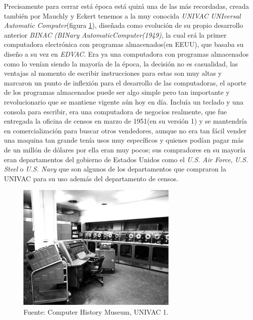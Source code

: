\documentclass[letterpaper,12pt,oneside]{book}
\begin{document}
		
		
		Precisamente para cerrar está época está quizá una de las más recordadas, creada también por Mauchly y Eckert tenemos a la muy conocida	
		\textit{UNIVAC UNIversal Automatic Computer}(figura \ref{fig:univac1}), diseñada como evolución de su propio desarrollo  anterior
		\textit{BINAC (BINary AutomaticComputer(1949)}, la cual erá la primer computadora electrónica con programas almacenados(en EEUU), que basaba su diseño
		a su vez en \textit{EDVAC}.
		Era ya una computadora con programas almacenados como lo venían siendo la mayoría de la época, la decisión no es casualidad, las
		ventajas al momento de escribir instrucciones para estas son muy altas y marcaron un punto de inflexión para el desarrollo de las computadoras,
		el aporte de los programas almacenados puede ser algo simple pero tan importante y revolucionario que se mantiene vigente aún hoy en día. Incluía un teclado y una 
		consola para escribir, era una computadora de negocios realmente, que
		fue entregada la oficina de censos en marzo de 1951(en su versión 1) y se mantendría en comercialización para buscar otros vendedores, aunque no era tan fácil 
		vender una maquina
		tan grande tenía usos muy específicos y quienes podían pagar más de un millón de dólares por ella eran muy pocos; sus compradores en su mayoría
		eran departamentos del gobierno de Estados Unidos como el \textit{U.S. Air Force}, \textit{U.S. Steel} o \textit{U.S. Navy} que son algunos de los departamentos que
		compraron la UNIVAC para su uso además del departamento de censos\cite[p.43]{oregan_brief_2012}.
		
		
		\begin{figure}
		    \centering
		    \includegraphics[width=0.7\textwidth]{media/Historia/CHM_computers_1951.univacI.jpg}
		    \caption{Fuente: Computer History Museum, UNIVAC 1.}
	    	\label{fig:univac1}
		\end{figure}
		
\end{document}
